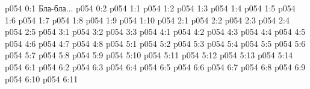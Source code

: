 \author{Могущественный Посланник}
\vs p054 0:1  Бла-бла...
\vs p054 0:2 
\vs p054 1:1 
\vs p054 1:2 
\vs p054 1:3 
\vs p054 1:4 
\vs p054 1:5 
\vs p054 1:6 
\vs p054 1:7 \pc 
\vs p054 1:8 \pc 
\vs p054 1:9 
\vs p054 1:10 
\vs p054 2:1 
\vs p054 2:2 
\vs p054 2:3 \pc 
\vs p054 2:4 
\vs p054 2:5 \pc 
{}
\vs p054 3:1 
\vs p054 3:2 
\vs p054 3:3 
\vs p054 4:1 
\vs p054 4:2 
\vs p054 4:3 
\vs p054 4:4 \pc 
\vs p054 4:5 \pc 
\vs p054 4:6 
\vs p054 4:7 
\vs p054 4:8 
\vs p054 5:1 
\vs p054 5:2 
\vs p054 5:3 
\vs p054 5:4 
\vs p054 5:5 
\vs p054 5:6 
\vs p054 5:7 
\vs p054 5:8 
\vs p054 5:9 
\vs p054 5:10 
\vs p054 5:11 
\vs p054 5:12 
\vs p054 5:13 
\vs p054 5:14 \pc 
{}
\vs p054 6:1 
\vs p054 6:2 
\vs p054 6:3 \pc 
\vs p054 6:4 
\vs p054 6:5 
\vs p054 6:6 \pc 
\vs p054 6:7 
\vs p054 6:8 
\vs p054 6:9 
\vs p054 6:10 \pc 
\vsetoff
\vs p054 6:11 
\quizlink
